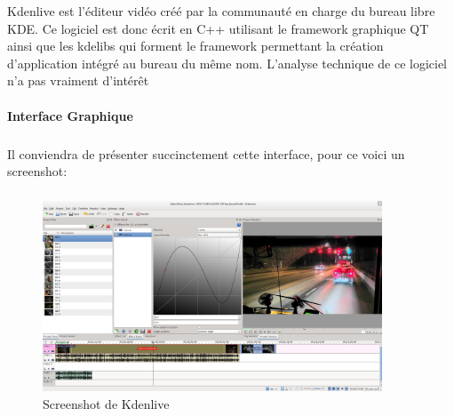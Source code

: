 {Kdenlive est l'éditeur vidéo créé par la communauté en charge
du bureau libre KDE. Ce logiciel est donc écrit en C++ utilisant le
framework graphique QT  ainsi que les kdelibs qui forment le framework
permettant la création d'application intégré au bureau du même nom.
L'analyse technique de ce logiciel n'a pas vraiment d'intérêt %

\paragraph {Interface Graphique}

\subparagraph{}

Il conviendra de présenter succinctement cette interface,
pour ce voici un screenshot:%

\subparagraph{}

\begin{figure}[H]

  \begin{center}

    \includegraphics[width=0.90\textwidth]{images/kdenlive}

  \end{center}

  \caption{Screenshot de Kdenlive}

  \label{Yes}


\end{figure}}
